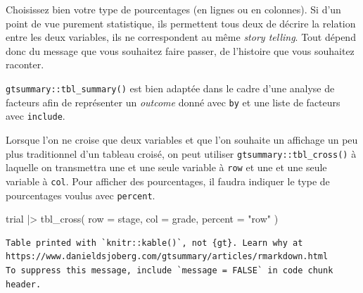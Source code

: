 \documentclass[
  letterpaper,
  DIV=11,
  numbers=noendperiod,
  oneside]{scrreprt}
\newenvironment{Shaded}{\begin{snugshade}}{\end{snugshade}}
\newcommand{\AttributeTok}[1]{\textcolor[rgb]{0.40,0.45,0.13}{#1}}
\newcommand{\FunctionTok}[1]{\textcolor[rgb]{0.28,0.35,0.67}{#1}}
\newcommand{\NormalTok}[1]{\textcolor[rgb]{0.00,0.23,0.31}{#1}}
\newcommand{\SpecialCharTok}[1]{\textcolor[rgb]{0.37,0.37,0.37}{#1}}
\newcommand{\StringTok}[1]{\textcolor[rgb]{0.13,0.47,0.30}{#1}}
\begin{document}
\begin{tcolorbox}[enhanced jigsaw, colbacktitle=quarto-callout-important-color!10!white, opacityback=0, toprule=.15mm, colback=white, coltitle=black, bottomtitle=1mm, toptitle=1mm, titlerule=0mm, rightrule=.15mm, title=\textcolor{quarto-callout-important-color}{\faExclamation}\hspace{0.5em}{Important}, breakable, bottomrule=.15mm, opacitybacktitle=0.6, arc=.35mm, left=2mm, leftrule=.75mm, colframe=quarto-callout-important-color-frame]

Choisissez bien votre type de pourcentages (en lignes ou en colonnes).
Si d'un point de vue purement statistique, ils permettent tous deux de
décrire la relation entre les deux variables, ils ne correspondent au
même \emph{story telling}. Tout dépend donc du message que vous
souhaitez faire passer, de l'histoire que vous souhaitez raconter.

\end{tcolorbox}

\texttt{gtsummary::tbl\_summary()} est bien adaptée dans le cadre d'une
analyse de facteurs afin de représenter un \emph{outcome} donné avec
\texttt{by} et une liste de facteurs avec \texttt{include}.

Lorsque l'on ne croise que deux variables et que l'on souhaite un
affichage un peu plus traditionnel d'un tableau croisé, on peut utiliser
\texttt{gtsummary::tbl\_cross()} à laquelle on transmettra une et une
seule variable à \texttt{row} et une et une seule variable à
\texttt{col}. Pour afficher des pourcentages, il faudra indiquer le type
de pourcentages voulus avec \texttt{percent}.

\begin{Shaded}
\begin{Highlighting}[]
\NormalTok{trial }\SpecialCharTok{|\textgreater{}} 
  \FunctionTok{tbl\_cross}\NormalTok{(}
    \AttributeTok{row =}\NormalTok{ stage,}
    \AttributeTok{col =}\NormalTok{ grade,}
    \AttributeTok{percent =} \StringTok{"row"}
\NormalTok{  )}
\end{Highlighting}
\end{Shaded}

\begin{verbatim}
Table printed with `knitr::kable()`, not {gt}. Learn why at
https://www.danieldsjoberg.com/gtsummary/articles/rmarkdown.html
To suppress this message, include `message = FALSE` in code chunk header.
\end{verbatim}
\end{document}
